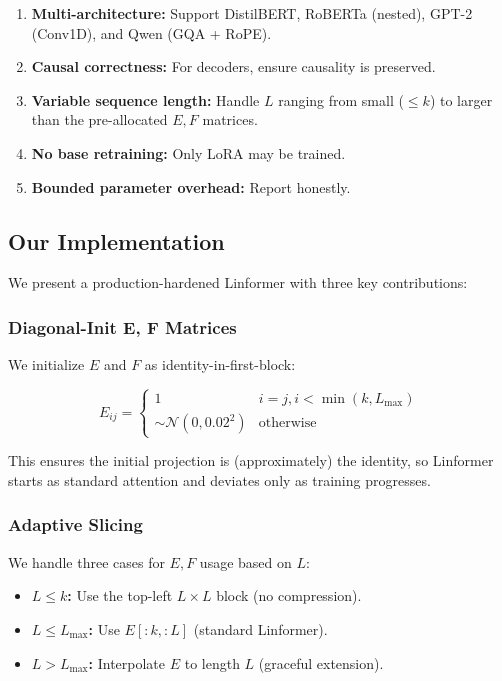 \begin{enumerate}
\item \textbf{Multi-architecture:} Support DistilBERT, RoBERTa (nested), GPT-2
  (Conv1D), and Qwen (GQA + RoPE).
\item \textbf{Causal correctness:} For decoders, ensure causality is preserved.
\item \textbf{Variable sequence length:} Handle $L$ ranging from small ($\le$$k$) to
  larger than the pre-allocated $E, F$ matrices.
\item \textbf{No base retraining:} Only LoRA may be trained.
\item \textbf{Bounded parameter overhead:} Report honestly.

\end{enumerate}
\subsection{Our Implementation}

We present a production-hardened Linformer with three key contributions:

\subsubsection{Diagonal-Init E, F Matrices}

We initialize $E$ and $F$ as identity-in-first-block:

\[
E_{ij} = \begin{cases} 1 & i = j, i < \min(k, L_\text{max}) \\ \sim \mathcal{N}(0, 0.02^2) & \text{otherwise} \end{cases}
\tag{1.5}
\]

This ensures the initial projection is (approximately) the identity, so 
Linformer starts as standard attention and deviates only as training 
progresses.

\subsubsection{Adaptive Slicing}

We handle three cases for $E, F$ usage based on $L$:

\begin{itemize}
\item \textbf{$L \leq k$:} Use the top-left $L \times L$ block (no compression).
\item \textbf{$L \leq L_\text{max}$:} Use $E[:k, :L]$ (standard Linformer).
\item \textbf{$L > L_\text{max}$:} Interpolate $E$ to length $L$ (graceful extension).

\end{itemize}
